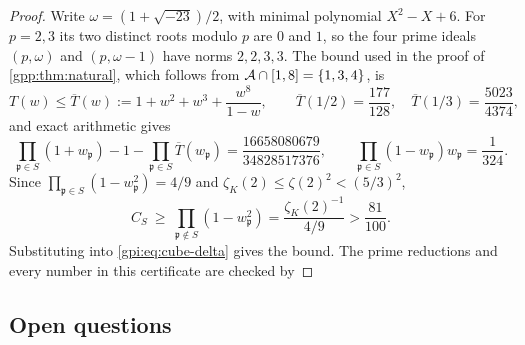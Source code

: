 \begin{proof}
Write $\omega=(1+\sqrt{-23})/2$, with minimal polynomial $X^2-X+6$. For $p=2,3$ its two
distinct roots modulo $p$ are $0$ and $1$, so the four prime ideals $(p,\omega)$ and
$(p,\omega-1)$ have norms $2,2,3,3$. The bound used in the proof of \cref{gpp:thm:natural},
which follows from $\mathcal A\cap[1,8]=\{1,3,4\}$, is
\[
 T(w)\le\overline T(w):=1+w^2+w^3+\frac{w^8}{1-w},\qquad
 \overline T(1/2)=\frac{177}{128},\quad\overline T(1/3)=\frac{5023}{4374},
\]
and exact arithmetic gives
\[
 \prod_{\mathfrak p\in S}(1+w_{\mathfrak p})-1-\prod_{\mathfrak p\in S}\overline T(w_{\mathfrak p})
 =\frac{16658080679}{34828517376},\qquad
 \prod_{\mathfrak p\in S}(1-w_{\mathfrak p})w_{\mathfrak p}=\frac1{324}.
\]
Since $\prod_{\mathfrak p\in S}(1-w_{\mathfrak p}^2)=4/9$ and
$\zeta_K(2)\le\zeta(2)^2<(5/3)^2$,
\[
 C_S\ \ge\ \prod_{\mathfrak p\notin S}(1-w_{\mathfrak p}^2)=\frac{\zeta_K(2)^{-1}}{4/9}>\frac{81}{100}.
\]
Substituting into \eqref{gpi:eq:cube-delta} gives the bound. The prime reductions and every
number in this certificate are checked by
\end{proof}

\subsection{Open questions}\label{gpi:sec:open}
{\raggedright{}}

